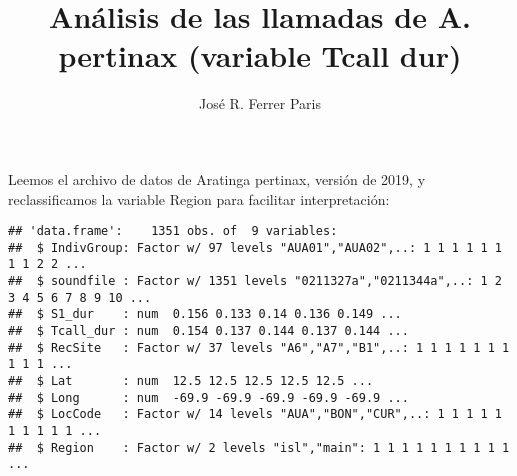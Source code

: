 \documentclass[]{article}
\title{Análisis de las llamadas de A. pertinax (variable Tcall dur)}
\author{José R. Ferrer Paris}
\date{}
\newenvironment{Shaded}{\begin{snugshade}}{\end{snugshade}}
\newcommand{\DataTypeTok}[1]{\textcolor[rgb]{0.13,0.29,0.53}{#1}}
\newcommand{\KeywordTok}[1]{\textcolor[rgb]{0.13,0.29,0.53}{\textbf{#1}}}
\newcommand{\NormalTok}[1]{#1}
\newcommand{\OperatorTok}[1]{\textcolor[rgb]{0.81,0.36,0.00}{\textbf{#1}}}
\newcommand{\StringTok}[1]{\textcolor[rgb]{0.31,0.60,0.02}{#1}}
\begin{document}
\maketitle

Leemos el archivo de datos de Aratinga pertinax, versión de 2019, y
reclassificamos la variable Region para facilitar interpretación:

\begin{Shaded}
\end{Shaded}

\begin{verbatim}
## 'data.frame':    1351 obs. of  9 variables:
##  $ IndivGroup: Factor w/ 97 levels "AUA01","AUA02",..: 1 1 1 1 1 1 1 1 2 2 ...
##  $ soundfile : Factor w/ 1351 levels "0211327a","0211344a",..: 1 2 3 4 5 6 7 8 9 10 ...
##  $ S1_dur    : num  0.156 0.133 0.14 0.136 0.149 ...
##  $ Tcall_dur : num  0.154 0.137 0.144 0.137 0.144 ...
##  $ RecSite   : Factor w/ 37 levels "A6","A7","B1",..: 1 1 1 1 1 1 1 1 1 1 ...
##  $ Lat       : num  12.5 12.5 12.5 12.5 12.5 ...
##  $ Long      : num  -69.9 -69.9 -69.9 -69.9 -69.9 ...
##  $ LocCode   : Factor w/ 14 levels "AUA","BON","CUR",..: 1 1 1 1 1 1 1 1 1 1 ...
##  $ Region    : Factor w/ 2 levels "isl","main": 1 1 1 1 1 1 1 1 1 1 ...
\end{verbatim}

\begin{Shaded}
\end{Shaded}
\end{document}
